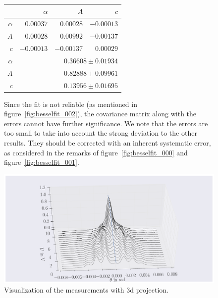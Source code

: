 \begin{figure}
\caption{
    Since the fit is not reliable (as mentioned in figure~\ref{fig:besselfit_002}), 
    the covariance matrix along with the errors cannot have further significance.
    We note that the errors are too small to take into account the strong deviation to the
    other results. They should be corrected with an inherent systematic error, as considered in
    the remarks of figure~\ref{fig:besselfit_000} and figure~\ref{fig:besselfit_001}.
}
 \begin{tabular}{|r|r|r|r|}
 \hline 
\cellcolor{tabcolor}&\cellcolor{tabcolor}$\alpha$&\cellcolor{tabcolor}$A$&\cellcolor{tabcolor}$c$\\ \hline 
 \cellcolor{tabcolor}$\alpha$&$0.00037$ &$0.00028$ &$-0.00013$ \\ 
\cellcolor{tabcolor}$A$&$0.00028$ &$0.00992$ &$-0.00137$ \\ 
\cellcolor{tabcolor}$c$&$-0.00013$ &$-0.00137$ &$0.00029$ \\ \hline \hline
\cellcolor{tabcolor}$\alpha$&\multicolumn{3}{r|}{$0.36608 \pm 0.01934$ }\\ 
\cellcolor{tabcolor}$A$&\multicolumn{3}{r|}{$0.82888 \pm 0.09961$ }\\ 
\cellcolor{tabcolor}$c$&\multicolumn{3}{r|}{$0.13956 \pm 0.01695$ }\\ 
\hline
\end{tabular}
\end{figure}
\newpage
\clearpage
\begin{figure}[htpb]
    \centering
    \includegraphics[width=1\textwidth]{./figures/plot3d}
    \caption{   Visualization of the measurements with 3d projection.
    }
    \label{fig:plot3d}
\end{figure}


